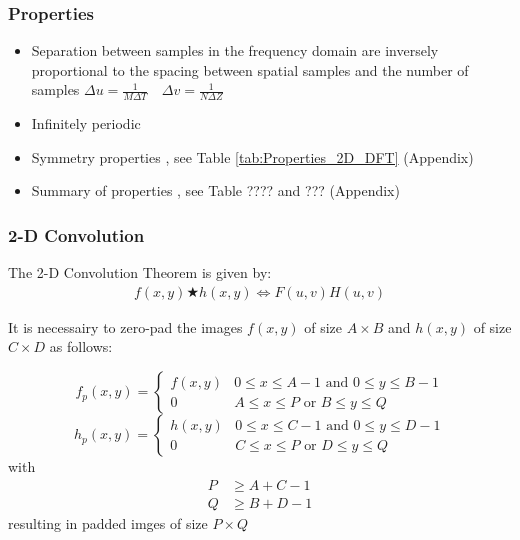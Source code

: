 \subsubsection{Properties}
\begin{itemize}
\item Separation between samples in the frequency domain are inversely proportional to the spacing between spatial samples and the number of samples
$\Delta u = \frac{1}{M \Delta T} \quad \Delta v = \frac{1}{N \Delta Z}$
\item Infinitely periodic
\item Symmetry properties , see Table \ref{tab:Properties_2D_DFT} (Appendix)
\item Summary of properties , see Table ???? and ??? (Appendix)

\end{itemize}

\subsubsection{2-D Convolution }
The 2-D Convolution Theorem is given by:
\begin{align}
	f(x,y) \bigstar h(x,y) \Leftrightarrow F(u,v)H(u,v)
\end{align}

It is necessairy to zero-pad the images $f(x,y)$ of size $A \times B$ and $h(x,y)$ of size $C \times D$ as follows:

\begin{equation}
	f_p(x,y) = 
		\begin{cases} 
			f(x,y) & 0 \leq x \leq A-1 \text{  and  } 0 \leq y \leq B-1 \\
			0 & A \leq x \leq P \text{  or  } B \leq y \leq Q
		\end{cases}
\end{equation}
\begin{equation}
	h_p(x,y) = 
		\begin{cases}
			h(x,y) & 0 \leq x \leq C-1 \text{  and  } 0 \leq y \leq D-1 \\
			0 & C \leq x \leq P \text{  or  } D \leq y \leq Q
		\end{cases}
\end{equation}
with
\begin{align}
	P &\geq A+C-1 \\
	Q &\geq B+D-1
	\label{equ:2D_Conv_Padding}
\end{align}
resulting in padded imges of size $P \times Q$

